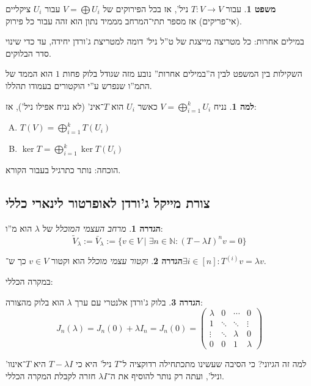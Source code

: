 \documentclass[a4paper]{article}
\newcommand\N     {\mathbb{N}}
\newcommand\co        {\colon}
\newcommand\pms[1]    {\begin{pmatrix}
		#1
\end{pmatrix}}
\renewcommand\lg      {\lambda}
\newcommand\tl    {\tilde}
\theoremstyle{definition}
\newtheorem{Theorem}{משפט}
\newtheorem{definition}{הגדרה}
\newtheorem{Lemma}{למה}
\newcommand\theo  [1] {\begin{Theorem}#1\end{Theorem}}
\newcommand\defi  [1] {\begin{definition}#1\end{definition}}
\newcommand\lem   [1] {\begin{Lemma}#1\end{Lemma}}
\begin{document}
	\theo{עבור $T \co V \to V$ ניל', אז בכל הפירוקים של $V = \bigoplus U_i$ עבור $U_i$ ציקליים (אי־פריקים) אז מספר תתי־המרחב מממיד נתון הוא זהה עבור כל פירוק. }
	
	במילים אחרות: כל מטריצה מייצגת של ט''ל ניל' דומה למטריצת ג'ורדן יחידה, עד כדי שינוי סדר הבלוקים. 
	
	השקילות בין המשפט לבין ה''במילים אחרות'' נובע מזה שגודל בלוק פחות $1$ הוא הממד של התמ''ו שנפרש ע''י הוקטורים בעמודו תהללו. 
	
	\lem{נניח $V = \bigoplus_{i = 1}^{k} U_i$ כאשר $U_i$ הוא $T$־אינ' (לא נניח אפילו ניל'), אז: 
		\begin{enumerate}[A.]
			\item \hfil $\displaystyle T(V) = \bigoplus_{i = 1}^{k}T(U_i)$
			\item \hfil $\displaystyle \ker T = \bigoplus_{i = 1}^k \ker T(U_i)$
	\end{enumerate}}
	הוכחה: נותר כתרגיל בעבור הקורא. 
	
	\subsection{צורת מייקל ג'ורדן לאופרטור לינארי כללי}
	\defi{\textit{מרחב העצמי המוכלל} של $\lg$ הוא מ''ו: 
	\[ \tl V_{\lg} := \bar V_{\lg} := \{v \in V \mid \exists n \in \N \co (T - \lg I)^nv = 0\} \]}
	\defi{\textit{וקטור עצמי מוכלל} הוא וקטור $v \in V$ כך ש־$\exists i \in [n] \co T^{(i)}v = \lg v$. }
	במקרה הכללי: \defi{בלוק ג'ורדן אלנטרי עם ערך $\lg$ הוא בלוק מהצורה: 
		\[ J_n(\lg) = J_n(0) + \lg I_n = J_n(0) = \pms{\lg & 0 & \cdots & 0 \\ 1 & \ddots & \ddots & \vdots \\ \vdots & \ddots & \lg & 0 \\ 0 & 0 & 1 & \lg} \]
	}
	למה זה הגיוני? כי הסיבה שעשינו מתכתחילה רדוקציה ל־$T$ ניל' היא כי $T - \lg I$ היא $T$־אינוו' וניל', ועתה רק נותר להוסיף את ה־$\lg I$ חזרה לקבלת המקרה הכללי. 
	
\end{document}
